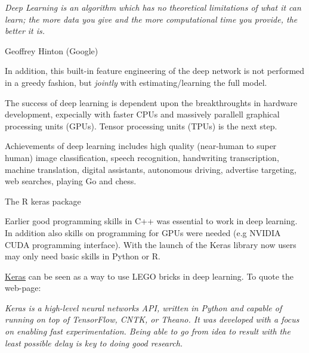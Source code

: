 \documentclass[10pt,ignorenonframetext,]{beamer}
\begin{document}
\begin{frame}

\emph{Deep Learning is an algorithm which has no theoretical limitations
of what it can learn; the more data you give and the more computational
time you provide, the better it is.}

Geoffrey Hinton (Google)

\end{frame}

\begin{frame}

In addition, this built-in feature engineering of the deep network is
not performed in a greedy fashion, but \emph{jointly} with
estimating/learning the full model.

The success of deep learning is dependent upon the breakthroughts in
hardware development, expecially with faster CPUs and massively
parallell graphical processing units (GPUs). Tensor processing units
(TPUs) is the next step.

Achievements of deep learning includes high quality (near-human to super
human) image classification, speech recognition, handwriting
transcription, machine translation, digital assistants, autonomous
driving, advertise targeting, web searches, playing Go and chess.

\end{frame}

\begin{frame}

\begin{block}{The R keras package}

Earlier good programming skills in C++ was essential to work in deep
learning. In addition also skills on programming for GPUs were needed
(e.g NVIDIA CUDA programming interface). With the launch of the Keras
library now users may only need basic skills in Python or R.

\href{https://keras.io/}{Keras} can be seen as a way to use LEGO bricks
in deep learning. To quote the web-page:

\emph{Keras is a high-level neural networks API, written in Python and
capable of running on top of TensorFlow, CNTK, or Theano. It was
developed with a focus on enabling fast experimentation. Being able to
go from idea to result with the least possible delay is key to doing
good research.}

\end{block}

\end{frame}
\end{document}
